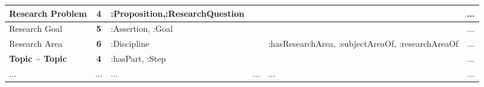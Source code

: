 \begin{table}[H]
\begin{tabular}{|p{2.8cm}|c|p{2.6cm}|p{2.2cm}|p{3cm}|c|}
Research Problem            & \cellcolor[HTML]{FDCA7D}\textbf{4} & :Proposition,\newline :ResearchQuestion &                           &                                                   & ... \\ \hline
Research Goal               & \cellcolor[HTML]{FFEB84}\textbf{5} & :Assertion, :Goal                           &                           &                                                   & ... \\ \hline
Research Area               & \cellcolor[HTML]{FFEB84}\textbf{6} & :Discipline                                 &                           & :hasResearchArea, \newline :subjectAreaOf, \newline :researchAreaOf & ... \\ \hline
\textbf{Topic -- Topic}      & \cellcolor[HTML]{FBAA77}\textbf{4} & :hasPart, :Step                             &                           &                                                   & ... \\ \hline
...                         & ...                                & ...                                         & ...                       & ...                                               & ... \\ \hline
\end{tabular}
\end{table}